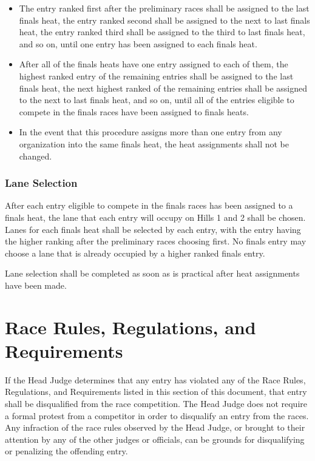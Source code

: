 	\begin{itemize}

		\item
		The entry ranked first after the preliminary races shall be assigned to the last finals heat, the entry ranked second shall be assigned to the next to last finals heat, the entry ranked third shall be assigned to the third to last finals heat, and so on, until one entry has been assigned to each finals heat.

		\item
		After all of the finals heats have one entry assigned to each of them, the highest ranked entry of the remaining entries shall be assigned to the last finals heat, the next highest ranked of the remaining entries shall be assigned to the next to last finals heat, and so on, until all of the entries eligible to compete in the finals races have been assigned to finals heats.

		\item
		In the event that this procedure assigns more than one entry from any organization into the same finals heat, the heat assignments shall not be changed.

	\end{itemize}

\subsubsection{Lane Selection}

	After each entry eligible to compete in the finals races has been assigned to a finals heat, the lane that each entry will occupy on Hills 1 and 2 shall be chosen. Lanes for each finals heat shall be selected by each entry, with the entry having the higher ranking after the preliminary races choosing first. No finals entry may choose a lane that is already occupied by a higher ranked finals entry.

	Lane selection shall be completed as soon as is practical after heat assignments have been made.

\section{Race Rules, Regulations, and Requirements}

	If the Head Judge determines that any entry has violated any of the Race Rules, Regulations, and Requirements listed in this section of this document, that entry shall be disqualified from the race competition. The Head Judge does not require a formal protest from a competitor in order to disqualify an entry from the races. Any infraction of the race rules observed by the Head Judge, or brought to their attention by any of the other judges or officials, can be grounds for disqualifying or penalizing the offending entry.

